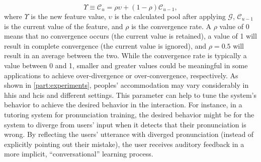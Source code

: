 %
\begin{equation}
	\Upsilon \equiv \mathcal{C}_u = \rho \upsilon + \left(1 - \rho \right) \mathcal{C}_{u-1},
	\label{eq:convergence_rate}
\end{equation}
\noindent
%
where $\Upsilon$ is the new feature value, $\upsilon$ is the calculated pool after applying $\mathcal{G}$, $\mathcal{C}_{u-1}$ is the current value of the feature, and $\rho$ is the convergence rate.
A $\rho$ value of 0 means that no convergence occurs (the current value is retained), a value of 1 will result in complete convergence (the current value is ignored), and $\rho=0.5$ will result in an average between the two.
While the convergence rate is typically a value between 0 and 1, smaller and greater values could be meaningful in some applications to achieve over-divergence or over-convergence, respectively.
As shown in \cref{part:experiments}, peoples' accommodation may vary considerably in \acp{hhi} and \acp{hci} and different settings.
This parameter can help to tune the system's behavior to achieve the desired behavior in the interaction.
For instance, in a tutoring system for pronunciation training, the desired behavior might be for the system to diverge from users' input when it detects that their pronunciation is wrong.
By reflecting the users' utterance with diverged pronunciation (instead of explicitly pointing out their mistake), the user receives auditory feedback in a more implicit, \enquote{conversational} learning process.

%

